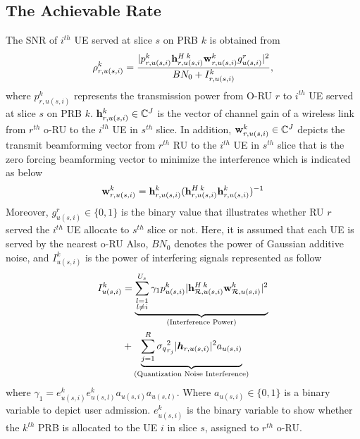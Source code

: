 \documentclass[conference]{IEEEtran}
\begin{document}
\subsection{The Achievable Rate}
The SNR of $i^{th}$ UE served at slice $s$ on PRB $k$ is obtained from
\begin{equation}\label{eq2}
\rho_{r,u(s,i)}^{k} =  \frac{|p_{r,u(s,i)}^{k}{\bold{h}_{r,u(s,i)}^{H \: k}} \bold{w}_{r,u(s,i)}^{k} g_{u(s,i)}^r|^2}{BN_0 + I_{r,u(s,i)}^{k}},
\end{equation} 
where $p_{r,u(s,i)}^{k}$ represents the transmission power from O-RU $r$ to $i^{th}$ UE served at slice $s$ on PRB $k$. 
${\bold{h}_{r,u(s,i)}^{k}} \in \mathbb{C}^{J}$ is the vector of channel gain of a wireless link from 
$r^{th}$ o-RU to the $i^{th}$ UE in $s^{th}$ slice. In addition, $\bold{w}_{r,u(s,i)}^{k} \in \mathbb{C}^{J}$ depicts the  transmit beamforming vector from $r^{th}$ RU to the $i^{th}$ UE in $s^{th}$ slice that is the zero forcing beamforming vector to minimize the interference which is indicated as below
\begin{equation}
\bold{w}_{r,u(s,i)}^{k} = {\bold{h}_{r,u(s,i)}^{k}}({\bold{h}_{r,u(s,i)}^{H \: k}} {\bold{h}_{r,u(s,i)}^{k}})^{-1}
\end{equation}
Moreover, $g_{u(s,i)}^r \in \{0,1\}$ is the binary value that illustrates whether RU $r$ served the $i^{th}$ UE allocate to $s^{th}$ slice or not. Here, it is assumed that each UE is served by the nearest o-RU
Also, $BN_0$ denotes the power of Gaussian additive noise, and $I_{u(s,i)}^{k}$ is the power of interfering signals represented as follow
\begin{equation}
\begin{split}
I_{u(s,i)}^{k} &=
 \underbrace{\sum_{\substack{l=1 \\ l\neq i}}^{{U}_{s}} \gamma_{1}  p_{u(s,i)}^{k} |{\bold{h}_{\mathcal{R},u(s,i)}^{H \: k}} \bold{w}_{\mathcal{R},u(s,i)}^{k} |^2}_{\text{(Interference Power)}}\\
&+\underbrace{  \sum_{j=1}^{{R}} {\sigma_q}_{r_j}^2 |\boldsymbol{h}_{r,{u(s,i)}}|^2 a_{u(s,i)}}_{\text{(Quantization Noise Interference)}}
\end{split}
\end{equation}
where $\gamma_{1} = e^{k}_{u(s,i)}e^{k}_{u(s,l)}a_{u(s,i)}a_{u(s,l)}$.
Where $a_{u(s,i)} \in \{0,1\}$ is a binary variable to depict user admission.
$e^{k}_{u(s,i)}$ is the binary variable to show whether the $k^{th}$ PRB is allocated to the UE $i$ in slice $s$, assigned to $r^{th}$ o-RU.
\end{document}
